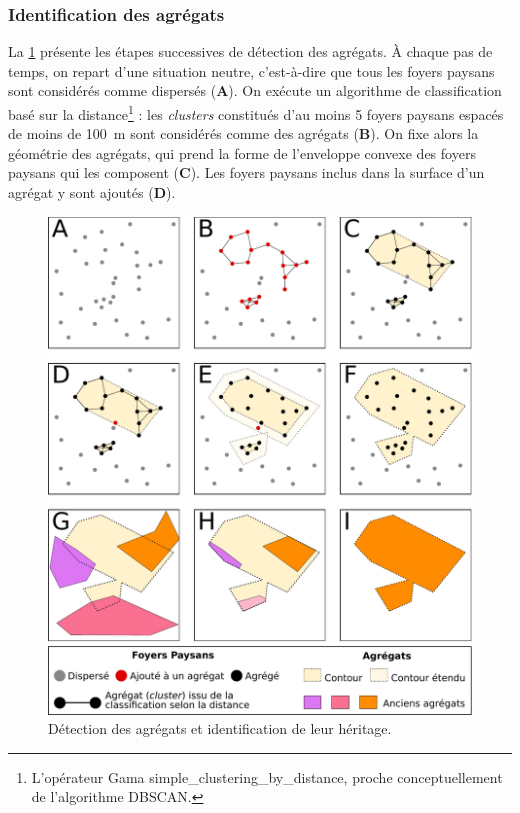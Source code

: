\subsubsection{Identification des agrégats \label{sssec:agregats}}

La \cref{fig:detection-agregats} présente les étapes successives de détection des agrégats.
À chaque pas de temps, on repart d'une situation \og neutre\fg{}, c'est-à-dire que tous les foyers paysans sont considérés comme dispersés (\textbf{A}).
On exécute un algorithme de classification basé sur la distance\footnote{
	L'opérateur Gama \textsf{simple\_clustering\_by\_distance}, proche conceptuellement de l'algorithme DBSCAN.
} : les \textit{clusters} constitués d'au moins 5 foyers paysans espacés de moins de 100~m sont considérés comme des agrégats (\textbf{B}).
On fixe alors la géométrie des agrégats, qui prend la forme de l'enveloppe convexe des foyers paysans qui les composent (\textbf{C}).
Les foyers paysans inclus dans la surface d'un agrégat y sont ajoutés (\textbf{D}).
	
\begin{figure}[H]
	\centering
	\includegraphics[width=.75\linewidth]{img/detection_agregats.pdf}
	\caption{Détection des agrégats et identification de leur \og héritage\fg{}.}
	\label{fig:detection-agregats}
\end{figure}

